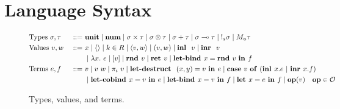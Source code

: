 \section{Language Syntax}

\begin{figure}[tbp]
  \begin{alignat*}{3}
         &\text{Types } \sigma, \tau &::=~ &\mathbf{unit}
         \mid \textbf{num}
         \mid \sigma \times \tau 
         \mid \sigma \otimes \tau
         \mid \sigma + \tau 
         \mid \sigma \multimap \tau
         \mid {{!_{s}} \sigma}
         \mid {M_u \tau}
         \\
         &\text{Values } v, w \ &::=~ &x
         \mid \langle \rangle
         \mid k \in R
         \mid \langle v,w \rangle 
         \mid  (v, w)
         \mid \textbf{inl } \ v
         \mid \textbf{inr } \ v
         \\
         & & & \mid \lambda x.~e 
         \mid [v]
         \mid\textbf{rnd } v
         \mid {\textbf{ret }v} 
         \mid \textbf{let-bind } x = \textbf{rnd } v \ \textbf{in } f \\
         &\text{Terms } e, f &::=~ & v
	\mid v~w
         \mid {\pi}_i\ v
         \mid \textbf{let-destruct } \ (x,y) = v \ \textbf{in } e
         \mid \mathbf{case} \ v \ \mathbf{of} \ (\textbf{inl } x.e \ | \ \textbf{inr } x.f) 
         \\
         & & & \mid
          \textbf{let-cobind } x = v \ \textbf{in }  e
         \mid {\textbf{let-bind }x = v \ \textbf{in }f} 
         \mid \textbf{let } x  = e \ \textbf{in }  f 
         \mid \mathbf{op}(v) \quad \mathbf{op} \in \mathcal{O}
  \end{alignat*}
  \caption{Types, values, and terms.}
  \label{fig:syntax}
\end{figure}



